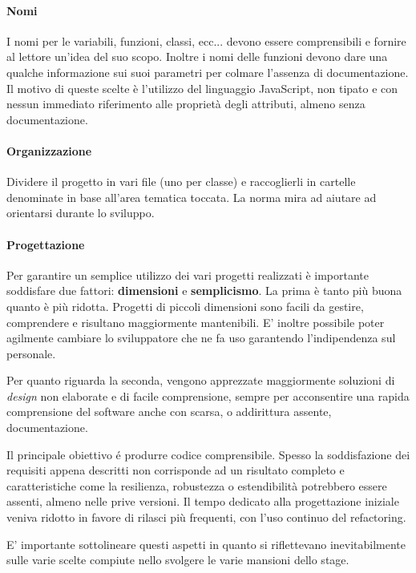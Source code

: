 \paragraph{Nomi}
I nomi per le variabili, funzioni, classi, ecc... devono essere comprensibili
e fornire al lettore un'idea del suo scopo. Inoltre i nomi delle funzioni
devono dare una qualche informazione sui suoi parametri per colmare l'assenza
di documentazione. Il motivo di queste scelte è l'utilizzo del linguaggio 
JavaScript, non tipato e con nessun immediato riferimento alle proprietà degli
attributi, almeno senza documentazione.

\paragraph{Organizzazione}
Dividere il progetto in vari file (uno per classe) e raccoglierli in cartelle
denominate in base all'area tematica toccata. La norma mira ad aiutare ad 
orientarsi durante lo sviluppo.

\paragraph{Progettazione}
Per garantire un semplice utilizzo dei vari progetti realizzati è importante
soddisfare due fattori: \textbf{dimensioni} e \textbf{semplicismo}.
La prima è tanto più buona quanto è più ridotta. Progetti di piccoli dimensioni
sono facili da gestire, comprendere e risultano maggiormente mantenibili. E'
inoltre possibile poter agilmente cambiare lo sviluppatore che ne fa uso
garantendo l'indipendenza sul personale.

Per quanto riguarda la seconda, vengono apprezzate maggiormente soluzioni di
\textit{design} non elaborate e di facile comprensione, sempre per acconsentire
una rapida comprensione del software anche con scarsa, o addirittura assente,
documentazione.

Il principale obiettivo é produrre codice comprensibile. Spesso la
soddisfazione dei requisiti appena descritti non corrisponde ad un risultato
completo e caratteristiche come la resilienza, robustezza o estendibilità
potrebbero essere assenti, almeno nelle prive versioni. Il tempo dedicato
alla progettazione iniziale veniva ridotto in favore di rilasci più frequenti,
con l'uso continuo del \gls{refactoring}.

E' importante sottolineare questi aspetti in quanto si riflettevano
inevitabilmente sulle varie scelte compiute nello svolgere le varie mansioni
dello stage.
